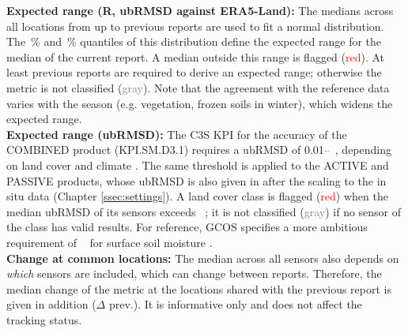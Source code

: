 \noindent\textbf{Expected range (R, ubRMSD against ERA5-Land):} The medians across all locations from up to  previous reports are used to fit a normal distribution.
The \,\% and \,\% quantiles of this distribution define the expected range for the median of the current report.
A median outside this range is flagged (\textcolor{red}{red}).
At least  previous reports are required to derive an expected range; otherwise the metric is not classified (\textcolor{gray}{gray}).
Note that the agreement with the reference data varies with the season (e.g. vegetation, frozen soils in winter), which widens the expected range.
\\[1em]
\noindent\textbf{Expected range (ubRMSD):} The \ac{C3S} \ac{KPI} for the accuracy of the COMBINED product (KPI.SM.D3.1) requires a \ac{ubRMSD} of 0.01--\kpithres{}~\unitsm{}, depending on land cover and climate \citep{c3spqar}.
The same threshold is applied to the ACTIVE and PASSIVE products, whose \ac{ubRMSD} is also given in \unitsm{} after the scaling to the in situ data (Chapter \ref{ssec:settings}).
A land cover class is flagged (\textcolor{red}{red}) when the median \ac{ubRMSD} of its sensors exceeds \kpithres{}~\unitsm{}; it is not classified (\textcolor{gray}{gray}) if no sensor of the class has valid results.
For reference, \ac{GCOS} specifies a more ambitious requirement of \gcosthres{}~\unitsm{} for surface soil moisture \citep{gcos2022}.
\\[1em]
\noindent\textbf{Change at common locations:} The median across all sensors also depends on \textit{which} sensors are included, which can change between reports.
Therefore, the median change of the metric at the locations shared with the previous report is given in addition ($\Delta$ prev.).
It is informative only and does not affect the tracking status.

